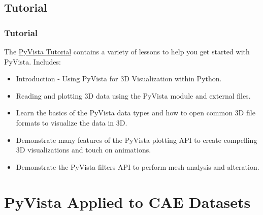 \documentclass[t]{beamer}
\begin{document}
\subsection{Tutorial}
\begin{frame}
    \frametitle{Tutorial}

    The \href{https://tutorial.pyvista.org}{PyVista Tutorial} contains a variety of lessons to help you get started with PyVista. Includes:

    \begin{itemize}[leftmargin=10pt, label=•]
        \item Introduction - Using PyVista for 3D Visualization within Python.
        \item Reading and plotting 3D data using the PyVista module and external files.
        \item Learn the basics of the PyVista data types and how to open common 3D file formats to visualize the data in 3D.
        \item Demonstrate many features of the PyVista plotting API to create compelling 3D visualizations and touch on animations.
        \item Demonstrate the PyVista filters API to perform mesh analysis and alteration.
    \end{itemize}

\end{frame}

\section{PyVista Applied to CAE Datasets}
\end{document}
